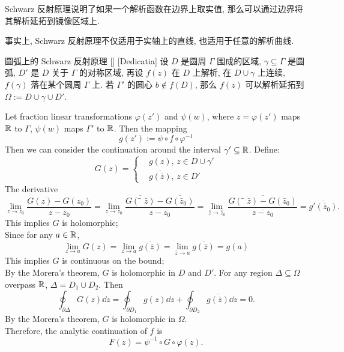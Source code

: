         \begin{rmk}
            [Dedicatia]
            Schwarz 反射原理说明了如果一个解析函数在边界上取实值, 那么可以通过边界将其解析延拓到镜像区域上.
        \end{rmk}

        事实上, Schwarz 反射原理不仅适用于实轴上的直线, 也适用于任意的解析曲线.

        \begin{thm}
            {圆弧上的 Schwarz 反射原理}
            []
            [Dedicatia]
            设 \(D\) 是圆周 \(\Gamma\) 围成的区域, \(\gamma\subseteq\Gamma\) 是圆弧, \(D'\) 是 \(D\) 关于 \(\Gamma\) 的对称区域, 再设 \(f(z)\) 在 \(D\) 上解析, 在 \(D\cup\gamma\) 上连续, \(f(\gamma)\) 落在某个圆周 \(\Gamma\) 上. 若 \(\Gamma'\) 的圆心 \(b\notin f(D)\), 那么 \(f(z)\) 可以解析延拓到 \(\Omega:=D\cup\gamma\cup D'\).
        \end{thm}

        \begin{prf}
            Let fraction linear transformations \(\varphi(z')\) and \(\psi(w)\), where \(z=\varphi(z')\) maps \(\operatorname{\mathbb{R}}\) to \(\Gamma\), \(\psi(w)\) maps \(\Gamma'\) to \(\operatorname{\mathbb{R}}\). Then the mapping
            \[g(z'):=\psi\circ f\circ\varphi^{-1} \]
            Then we can consider the continuation around the interval \(\gamma'\subseteq\operatorname{\mathbb{R}}\). Define:
            \[G(z)=\begin{cases}
                & g(z),\, z\in D\cup\gamma'\\
                & \overline{g(\bar{z})},\,z\in D'
            \end{cases}\]
            The derivative
            \[\lim_{z\to z_0}\frac{G(z)-G(z_0)}{z-z_0}=\lim_{z\to z_0}\frac{\overline{G(̄\bar z)}-\overline{G(\bar z_0)}}{z-z_0}=\lim_{\bar z\to\bar z_0}\frac{\overline{G(̄\bar z)-G(\bar z_0)}}{\overline{z-z_0}}=\overline{g'(\bar z_0)}.\]
            This implies \(G\) is holomorphic;\\
            Since for any \(a\in\operatorname{\mathbb{R}}\),
            \[\lim_{z\to a}G(z)=\lim_{z\to a}\overline{g(\bar z)}=\lim_{\bar z\to a}\overline{g(\bar z)}=g(a)\]
            This implies \(G\) is continuous on the bound;\\
            By the Morera's theorem, \(G\) is holomorphic in \(D\) and \(D'\). For any region \(\Delta\subseteq\Omega\) overpass \(\operatorname{\mathbb{R}}\), \(\Delta=D_1\cup D_2\). Then
            \[\oint_{\partial \Delta}G(z)\dd{z}=\oint_{\partial D_1}g(z)\dd{z}+\oint_{\partial D_2}\overline{g(\bar z)}\dd{z}=0.\]
            By the Morera's theorem, \(G\) is holomorphic in \(\Omega\).\\
            Therefore, the analytic continuation of \(f\) is
            \[F(z)=\psi^{-1}\circ G\circ \varphi(z).\]
        \end{prf}

